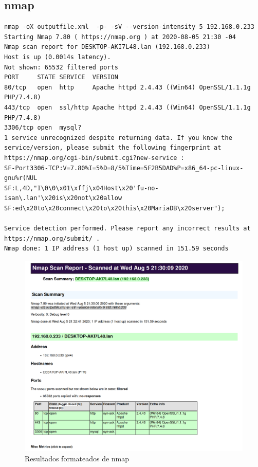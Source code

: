 \subsection{nmap}

\begin{verbatim}
nmap -oX outputfile.xml  -p- -sV --version-intensity 5 192.168.0.233 
Starting Nmap 7.80 ( https://nmap.org ) at 2020-08-05 21:30 -04
Nmap scan report for DESKTOP-AKI7L48.lan (192.168.0.233)
Host is up (0.0014s latency).
Not shown: 65532 filtered ports
PORT     STATE SERVICE  VERSION
80/tcp   open  http     Apache httpd 2.4.43 ((Win64) OpenSSL/1.1.1g PHP/7.4.8)
443/tcp  open  ssl/http Apache httpd 2.4.43 ((Win64) OpenSSL/1.1.1g PHP/7.4.8)
3306/tcp open  mysql?
1 service unrecognized despite returning data. If you know the service/version, please submit the following fingerprint at https://nmap.org/cgi-bin/submit.cgi?new-service :
SF-Port3306-TCP:V=7.80%I=5%D=8/5%Time=5F2B5DAD%P=x86_64-pc-linux-gnu%r(NUL
SF:L,4D,"I\0\0\x01\xffj\x04Host\x20'fu-no-isan\.lan'\x20is\x20not\x20allow
SF:ed\x20to\x20connect\x20to\x20this\x20MariaDB\x20server");

Service detection performed. Please report any incorrect results at https://nmap.org/submit/ .
Nmap done: 1 IP address (1 host up) scanned in 151.59 seconds
\end{verbatim}


\begin{figure}
	\centering
	\includegraphics[width=.9\textwidth]{fragments/pentest/nmap.png}
    \caption{ Resultados formateados de nmap }
\end{figure}


